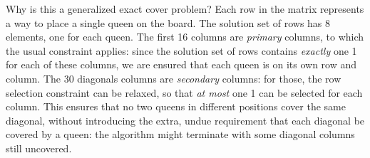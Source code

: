 \documentclass[table]{article}
\begin{document}
Why is this a generalized exact cover problem? Each row in the matrix represents a way to place a single queen on the board. The solution set of rows has 8 elements, one for each queen. The first 16 columns are {\em primary} columns, to which the usual constraint applies: since the solution set of rows contains {\em exactly} one 1 for each of these columns, we are ensured that each queen is on its own row and column.  The 30 diagonals columns are {\em secondary} columns: for those, the row selection constraint can be relaxed, so that {\em at most} one 1 can be selected for each  column. This ensures that no two queens in different positions cover the same diagonal, without introducing the extra, undue requirement that each diagonal  be covered by a queen: the algorithm might terminate with some diagonal columns still uncovered.
\end{document}
